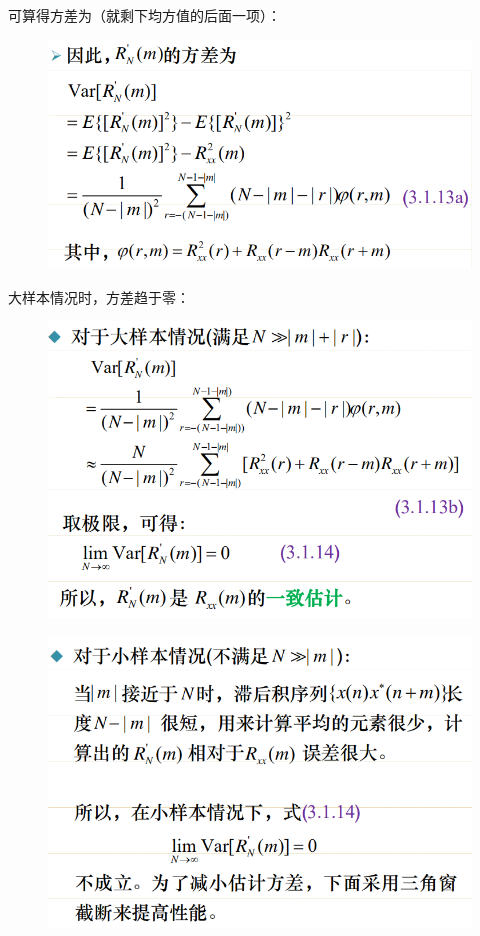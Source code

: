 \documentclass[UTF8]{ctexart} %
\begin{document}
				可算得方差为（就剩下均方值的后面一项）：
				\begin{figure}[H]
					\centering\includegraphics[scale=0.4]{82.png}
				\end{figure}
				大样本情况时，方差趋于零：
				\begin{figure}[H]
					\centering\includegraphics[scale=0.4]{83.png}
				\end{figure}
				\begin{figure}[H]
					\centering\includegraphics[scale=0.4]{84.png}
				\end{figure}
\end{document}

